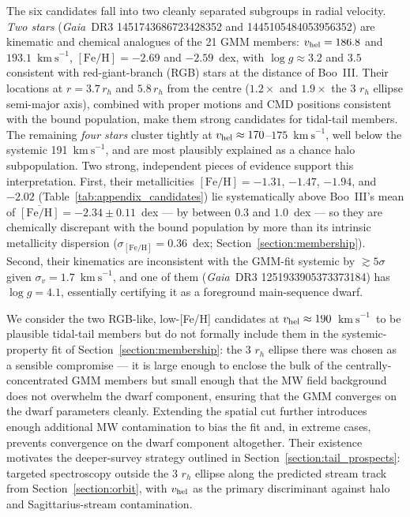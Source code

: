 \documentclass[twocolumn]{aastex631}
\newcommand{\gaia}{\textit{Gaia}\xspace}
\newcommand{\vlosUnits}{$\mathrm{km~s}^{-1}$\xspace}
\begin{document}
The six candidates fall into two cleanly separated subgroups in radial velocity.
\emph{Two stars} (\gaia\ DR3 1451743686723428352 and 1445105484053956352) are kinematic and chemical analogues of the 21 GMM members: $v_{\rm hel} = 186.8$ and $193.1$~\vlosUnits, $[\mathrm{Fe/H}] = -2.69$ and $-2.59$~dex, with $\log g \approx 3.2$ and $3.5$ consistent with red-giant-branch (RGB) stars at the distance of Boo~III.
Their locations at $r = 3.7\,r_h$ and $5.8\,r_h$ from the centre ($1.2\times$ and $1.9\times$ the 3 $r_h$ ellipse semi-major axis), combined with proper motions and CMD positions consistent with the bound population, make them strong candidates for tidal-tail members.
The remaining \emph{four stars} cluster tightly at $v_{\rm hel} \approx 170$--$175$~\vlosUnits, well below the systemic 191~\vlosUnits, and are most plausibly explained as a chance halo subpopulation. Two strong, independent pieces of evidence support this interpretation. First, their metallicities $[\mathrm{Fe/H}] = -1.31$, $-1.47$, $-1.94$, and $-2.02$ (Table~\ref{tab:appendix_candidates}) lie systematically above Boo~III's mean of $\overline{[\mathrm{Fe/H}]} = -2.34 \pm 0.11$~dex --- by between $0.3$ and $1.0$~dex --- so they are chemically discrepant with the bound population by more than its intrinsic metallicity dispersion ($\sigma_{[\mathrm{Fe/H}]} = 0.36$~dex; Section~\ref{section:membership}). Second, their kinematics are inconsistent with the GMM-fit systemic by $\gtrsim 5\sigma$ given $\sigma_v = 1.7$~\vlosUnits, and one of them (\gaia\ DR3 1251933905373373184) has $\log g = 4.1$, essentially certifying it as a foreground main-sequence dwarf.

We consider the two RGB-like, low-[Fe/H] candidates at $v_{\rm hel} \approx 190$~\vlosUnits\ to be plausible tidal-tail members but do not formally include them in the systemic-property fit of Section~\ref{section:membership}: the 3 $r_h$ ellipse there was chosen as a sensible compromise --- it is large enough to enclose the bulk of the centrally-concentrated GMM members but small enough that the MW field background does not overwhelm the dwarf component, ensuring that the GMM converges on the dwarf parameters cleanly. Extending the spatial cut further introduces enough additional MW contamination to bias the fit and, in extreme cases, prevents convergence on the dwarf component altogether.
Their existence motivates the deeper-survey strategy outlined in Section~\ref{section:tail_prospects}:
targeted spectroscopy outside the 3 $r_h$ ellipse along the predicted stream track from Section~\ref{section:orbit}, with $v_{\rm hel}$ as the primary discriminant against halo and Sagittarius-stream contamination.
\end{document}
